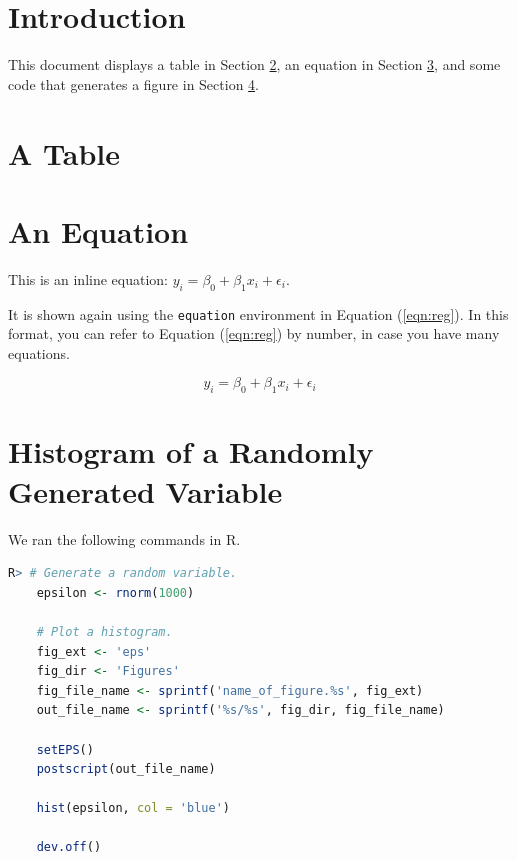 \documentclass[11pt]{article}
\begin{document}
\section{Introduction}

This document displays a table in Section \ref{sec:tab}, 
an equation in Section \ref{sec:eqn}, 
and some code that generates a figure in Section \ref{sec:fig}.


\section{A Table} \label{sec:tab}






\section{An Equation} \label{sec:eqn}

This is an inline equation: $y_i = \beta_0 + \beta_1 x_i + \epsilon_i$. 

\noindent It is shown again using the \texttt{equation} environment 
 in Equation (\ref{eqn:reg}). In this format, you can refer to 
Equation (\ref{eqn:reg}) by number, in case you have many equations. 

\begin{equation} \label{eqn:reg}
y_i = \beta_0 + \beta_1 x_i + \epsilon_i
\end{equation}


\section{Histogram of a Randomly Generated Variable} \label{sec:fig}

We ran the following commands in R.

\begin{lstlisting}[language=R]
R> # Generate a random variable.
    epsilon <- rnorm(1000)
    
    # Plot a histogram.
    fig_ext <- 'eps'
    fig_dir <- 'Figures'
    fig_file_name <- sprintf('name_of_figure.%s', fig_ext)
    out_file_name <- sprintf('%s/%s', fig_dir, fig_file_name)
    
    setEPS()
    postscript(out_file_name)
    
    hist(epsilon, col = 'blue')
    
    dev.off()
    
\end{lstlisting}
\end{document}
